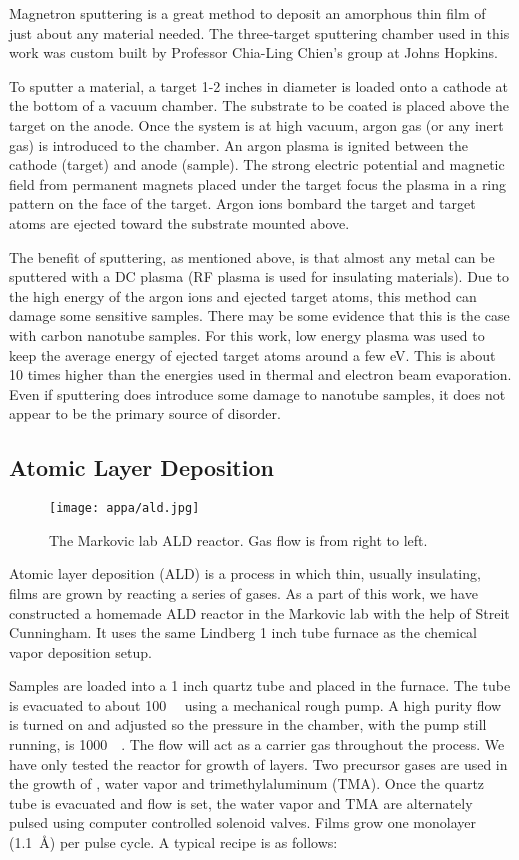 Magnetron sputtering is a great method to deposit an amorphous thin film of just about any material needed. The three-target sputtering chamber used in this work was custom built by Professor Chia-Ling Chien's group at Johns Hopkins.

To sputter a material, a target 1-2 inches in diameter is loaded onto a cathode at the bottom of a vacuum chamber. The substrate to be coated is placed above the target on the anode. Once the system is at high vacuum,  argon gas (or any inert gas) is introduced to the chamber. An argon plasma is ignited between the cathode (target) and anode (sample). The strong electric potential and magnetic field from permanent magnets placed under the target focus the plasma in a ring pattern on the face of the target. Argon ions bombard the target and target atoms are ejected toward the substrate mounted above. 

The benefit of sputtering, as mentioned above, is that almost any metal can be sputtered with a DC plasma (RF plasma is used for insulating materials). Due to the high energy of the argon ions and ejected target atoms, this method can damage some sensitive samples. There may be some evidence that this is the case with carbon nanotube samples. For this work, low energy plasma was used to keep the average energy of ejected target atoms around a few eV. This is about 10 times higher than the energies used in thermal and electron beam evaporation. Even if sputtering does introduce some damage to nanotube samples, it does not appear to be the primary source of disorder.

\subsection{Atomic Layer Deposition}
\label{subsec:ald}

\begin{figure}
	\centering
	\texttt{[image: appa/ald.jpg]}
	\caption{The Markovic lab ALD reactor. Gas flow is from right to left.} 
	\label{fig:ald}
\end{figure}

Atomic layer deposition (ALD) is a process in which thin, usually insulating, films are grown by reacting a series of gases. As a part of this work, we have constructed a homemade ALD reactor in the Markovic lab with the help of Streit Cunningham. It uses the same Lindberg 1 inch tube furnace as the chemical vapor deposition setup.

Samples are loaded into a 1 inch quartz tube and placed in the furnace. The tube is evacuated to about \SI{100}{\milli\torr} using a mechanical rough pump. A high purity  flow is turned on and adjusted so the pressure in the chamber, with the pump still running, is \SI{1000}{\milli\torr}. The  flow will act as a carrier gas throughout the process. We have only tested the reactor for growth of  layers. Two precursor gases are used in the growth of , water vapor and trimethylaluminum (TMA). Once the quartz tube is evacuated and  flow is set, the water vapor and TMA are alternately pulsed using computer controlled solenoid valves. Films grow one monolayer (\SI{1.1}{\angstrom}) per pulse cycle. A typical recipe is as follows:

